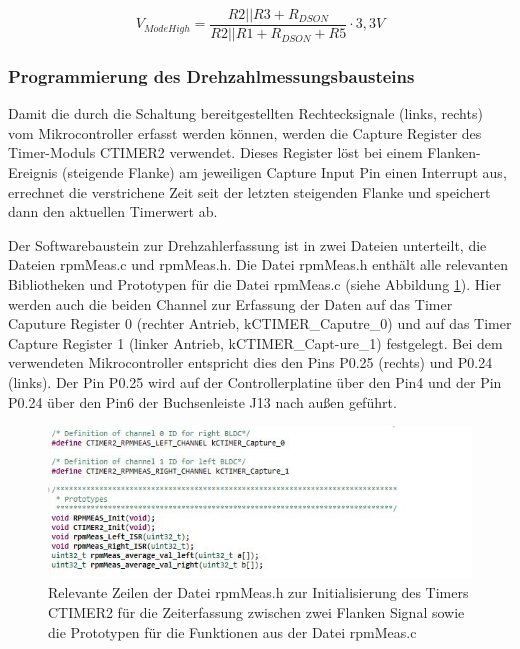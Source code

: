 \begin{equation}\label{eq4.4}
V_{ModeHigh} = \frac{ R2 || R3 + R_{DSON} }{R2 || R1 + R_{DSON} + R5 }\cdot 3,3V
\end{equation}

\newpage
\subsubsection{Programmierung des Drehzahlmessungsbausteins}\label{Sec4Sub5Sub5}

Damit die durch die Schaltung bereitgestellten Rechtecksignale (links, rechts) vom Mikrocontroller erfasst werden können, werden die Capture Register des Timer-Moduls CTIMER2 verwendet. Dieses Register löst bei einem Flanken-Ereignis (steigende Flanke) am jeweiligen Capture Input Pin einen Interrupt aus, errechnet die verstrichene Zeit seit der letzten steigenden Flanke und speichert dann den aktuellen Timerwert ab.\vspace{11pt}

Der Softwarebaustein zur Drehzahlerfassung ist in zwei Dateien unterteilt, die Dateien \glqq{}rpmMeas.c\grqq{} und \glqq{}rpmMeas.h\grqq{}. Die Datei \glqq{}rpmMeas.h\grqq{} enthält alle relevanten Bibliotheken und Prototypen für die Datei \glqq{}rpmMeas.c\grqq{} (siehe Abbildung \ref{fig:rpmMeasH}). Hier werden auch die beiden Channel zur Erfassung der Daten auf das Timer Caputure Register 0 (rechter Antrieb, \glqq{}kCTIMER\_Caputre\_0\grqq{}) und auf das Timer Capture Register 1 (linker Antrieb, \glqq{}kCTIMER\_Capt-ure\_1\grqq{}) festgelegt. Bei dem verwendeten Mikrocontroller entspricht dies den Pins P0.25 (rechts) und P0.24 (links). Der Pin P0.25 wird auf der Controllerplatine über den Pin4 und der Pin P0.24 über den Pin6 der Buchsenleiste J13 nach außen geführt.\vspace{11pt}

\begin{figure}[H] %
\includegraphics[width=.80\textwidth]{sec4/images/rpm_defines} 
\centering
\captionsetup{width=.95\textwidth}
\caption[Relevante Zeilen der Datei \glqq{}rpmMeas.h\grqq{}]{Relevante Zeilen der Datei \glqq{}rpmMeas.h\grqq{} zur Initialisierung des Timers CTIMER2 für die Zeiterfassung zwischen zwei Flanken Signal sowie die Prototypen für die Funktionen aus der Datei \glqq{}rpmMeas.c\grqq{}}\centering
\label{fig:rpmMeasH}
\end{figure}

